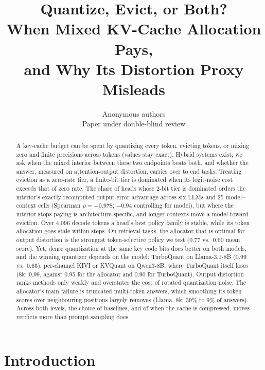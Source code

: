 \documentclass{article}
\title{Quantize, Evict, or Both?\\
When Mixed KV-Cache Allocation Pays,\\
and Why Its Distortion Proxy Misleads}
\author{Anonymous authors \\ Paper under double-blind review}
\theoremstyle{definition}
\begin{document}
\maketitle

\begin{abstract}
A key-cache budget can be spent by quantizing every token, evicting tokens, or mixing zero and finite precisions across tokens (values stay exact).  Hybrid systems exist; we ask when the mixed interior between these two endpoints beats both, and whether the answer, measured on attention-output distortion, carries over to end tasks.  Treating eviction as a zero-rate tier, a finite-bit tier is dominated when its logit-noise cost exceeds that of zero rate.  The share of heads whose 2-bit tier is dominated orders the interior's exactly recomputed output-error advantage across six LLMs and 25 model--context cells (Spearman $\rho=-0.978$; $-0.94$ controlling for model), but where the interior stops paying is architecture-specific, and longer contexts move a model toward eviction.  Over 4,096 decode tokens a head's best policy family is stable, while its token allocation goes stale within steps.  On retrieval tasks, the allocator that is optimal for output distortion is the strongest token-selective policy we test (0.77 vs.\ 0.60 mean score).  
Yet, %
dense quantization at the same key code bits does better on both models, and the winning quantizer depends on the model: TurboQuant on Llama-3.1-8B (0.99 vs.\ 0.65), per-channel KIVI or KVQuant on Qwen3-8B, where TurboQuant itself loses (8k: 0.99, against 0.95 for the allocator and 0.90 for TurboQuant).  Output distortion ranks methods only weakly and overstates the cost of rotated quantization noise.  The allocator's main failure is truncated multi-token answers, which smoothing its token scores over neighbouring positions largely removes (Llama, 8k: 39\% to 9\% of answers).  Across both levels, the choice of baselines, and of when the cache is compressed, moves verdicts more than prompt sampling does.
\end{abstract}

\section{Introduction}
\label{sec:intro}
\end{document}
